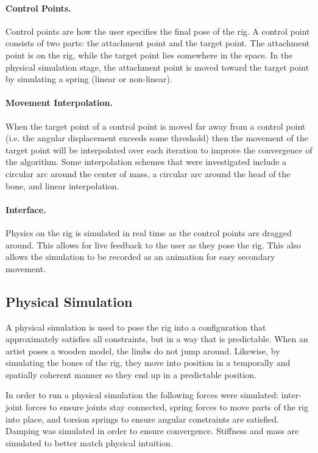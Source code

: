 \documentclass[10pt,twocolumn,letterpaper]{article}
\begin{document}
\paragraph{Control Points.} Control points are how the user specifies the final pose of the rig. A control point consists of two parts: the attachment point and the target point. The attachment point is on the rig, while the target point lies somewhere in the space. In the physical simulation stage, the attachment point is moved toward the target point by simulating a spring (linear or non-linear). 

\paragraph{Movement Interpolation.} When the target point of a control point is moved far away from a control point (i.e. the angular displacement exceeds some threshold) then the movement of the target point will be interpolated over each iteration to improve the convergence of the algorithm. Some interpolation schemes that were investigated include a circular arc around the center of mass, a circular arc around the head of the bone, and linear interpolation.

\paragraph{Interface.} Physics on the rig is simulated in real time as the control points are dragged around. This allows for live feedback to the user as they pose the rig. This also allows the simulation to be recorded as an animation for easy secondary movement.

\subsection{Physical Simulation}

A physical simulation is used to pose the rig into a configuration that approximately satisfies all constraints, but in a way that is predictable. When an artist poses a wooden model, the limbs do not jump around. Likewise, by simulating the bones of the rig, they move into position in a temporally and spatially coherent manner so they end up in a predictable position.

In order to run a physical simulation the following forces were simulated: inter-joint forces to ensure joints stay connected, spring forces to move parts of the rig into place, and torsion springs to ensure angular constraints are satisfied. Damping was simulated in order to ensure convergence. Stiffness and mass are simulated to better match physical intuition. \\
\end{document}
